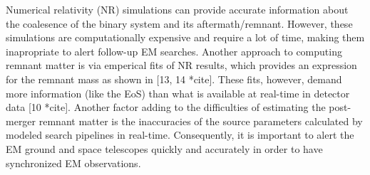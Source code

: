 

Numerical relativity (NR) simulations can provide accurate information about the coalesence of the binary system and its aftermath/remnant. However, these simulations are computationally expensive and require a lot of time, making them inapropriate to alert follow-up EM searches. Another approach to computing
remnant matter is via emperical fits of NR results, which provides an expression for the remnant mass as shown in [13, 14 *cite]. These fits, however, demand more information (like the EoS) than what is available at real-time in detector data [10 *cite]. Another factor adding to the difficulties of estimating the post-merger remnant matter is the inaccuracies of the source parameters calculated by modeled search pipelines in real-time. Consequently, it is important to alert the EM ground and space telescopes quickly and accurately in order to have synchronized EM observations.


